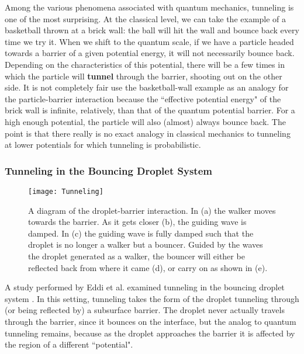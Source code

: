 Among the various phenomena associated with quantum mechanics, tunneling is one of the most surprising. At the classical level, we can take the example of a basketball thrown at a brick wall: the ball will hit the wall and bounce back every time we try it. When we shift to the quantum scale, if we have a particle headed towards a barrier of a given potential energy, it will not necessarily bounce back. Depending on the characteristics of this potential, there will be a few times in which the particle will \textbf{tunnel} through the barrier, shooting out on the other side. It is not completely fair use the basketball-wall example as an analogy for the particle-barrier interaction because the ``effective potential energy" of the brick wall is infinite, relatively, than that of the quantum potential barrier. For a high enough potential, the particle will also (almost) always bounce back. The point is that there really is no exact analogy in classical mechanics to tunneling at lower potentials for which tunneling is probabilistic. 

    \subsubsection{Tunneling in the Bouncing Droplet System}

\begin{figure}[h!]
 \centering
	    \texttt{[image: Tunneling]}
	     \caption{A diagram of the droplet-barrier interaction. In (a) the walker moves towards the barrier. As it gets closer (b), the guiding wave is damped. In (c) the guiding wave is fully damped such that the droplet is no longer a walker but a bouncer. Guided by the waves the droplet generated as a walker, the bouncer will either be reflected back from where it came (d), or carry on as shown in (e).}
	 \label{tuncartoon}
	\end{figure}
	A study performed by Eddi et al. examined tunneling in the bouncing droplet system \cite{tunneling}. In this setting, tunneling takes the form of the droplet tunneling through (or being reflected by) a subsurface barrier. The droplet never actually travels through the barrier, since it bounces on the interface, but the analog to quantum tunneling remains, because as the droplet approaches the barrier it is affected by the region of a different ``potential". 
	
